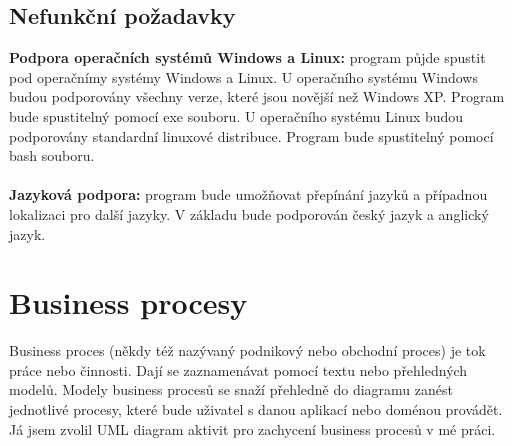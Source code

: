\documentclass[thesis=B,czech]{resources/FITthesis}[2012/06/26]
\begin{document}
\subsection{Nefunkční požadavky}\label{sec:funkcni_pozadavky}

\textbf{Podpora operačních systémů Windows a Linux:} program půjde spustit pod operačnímy systémy Windows a Linux. U operačního systému Windows budou podporovány všechny verze, které jsou novější než Windows XP. Program bude spustitelný pomocí exe souboru. U operačního systému Linux budou podporovány standardní linuxové distribuce. Program bude spustitelný pomocí bash souboru.\\
\\
\textbf{Jazyková podpora:} program bude umožňovat přepínání jazyků a případnou lokalizaci pro další jazyky. V základu bude podporován český jazyk a anglický jazyk.
	\section{Business procesy}
Business proces (někdy též nazývaný podnikový nebo obchodní proces) je tok práce nebo činnosti. Dají se zaznamenávat pomocí textu nebo přehledných modelů. Modely business procesů se snaží přehledně do diagramu zanést jednotlivé procesy, které bude uživatel s danou aplikací nebo doménou provádět. Já jsem zvolil UML diagram aktivit pro zachycení business procesů v mé práci.
\end{document}
